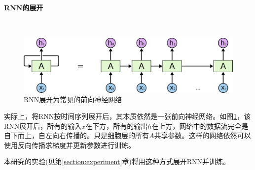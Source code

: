 \paragraph{RNN的展开}\ \par
\begin{figure}[htbp!]
    \centering
    \includegraphics[width = 1.\textwidth]{chap/img/RNN-unrolled.png}
    \caption{
        RNN展开为常见的前向神经网络\supercite{Understanding-LSTMs}
        }\label{fig:rnn_expand}
\end{figure}
\par
实际上，将RNN按时间序列展开后，其本质依然是一张前向神经网络。如图\ref{fig:rnn_expand}，该RNN展开后，所有的输入$x$在下方，所有的输出$h$在上方，网络中的数据流完全是自下而上，自左向右传播的。只是细胞层的所有$A$共享参数。这样的网络依然可以使用反向传播求梯度并更新参数进行训练。
\par
本研究的实验(见第\ref{section:experiment}章)将用这种方式展开RNN并训练。
\par

